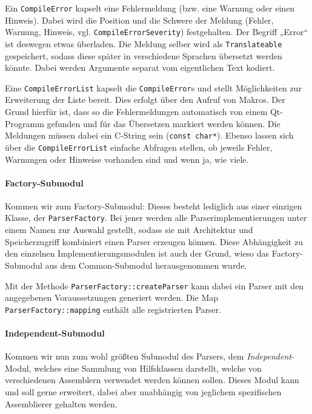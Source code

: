 Ein \texttt{CompileError} kapselt eine Fehlermeldung (bzw. eine Warnung oder
einen Hinweis). Dabei wird die Position und die Schwere der Meldung (Fehler,
Warnung, Hinweis, vgl. \texttt{Compile\-Error\-Severity}) festgehalten. Der
Begriff „Error“ ist deswegen etwas überladen. Die Meldung selber wird als
\texttt{Translateable} gespeichert, sodass diese später in verschiedene Sprachen
übersetzt werden könnte. Dabei werden Argumente separat vom eigentlichen Text
kodiert.

Eine \texttt{CompileErrorList} kapselt die \texttt{CompileError}s und stellt
Möglichkeiten zur Erweiterung der Liste bereit. Dies erfolgt über den Aufruf von
Makros. Der Grund hierfür ist, dass so die Fehlermeldungen automatisch von einem
Qt-Programm gefunden und für das Übersetzen markiert werden können. Die
Meldungen müssen dabei ein C-String sein (\texttt{const char*}). Ebenso lassen
sich über die \texttt{CompileErrorList} einfache Abfragen stellen, ob jeweils
Fehler, Warnungen oder Hinweise vorhanden sind und wenn ja, wie viele.

\paragraph{Factory-Submodul}

Kommen wir zum Factory-Submodul: Dieses besteht lediglich aus einer einzigen
Klasse, der \texttt{ParserFactory}. Bei jener werden alle
Parserimplementierungen unter einem Namen zur Auswahl gestellt, sodass sie mit
Architektur und Speicherzugriff kombiniert einen Parser erzeugen können. Diese
Abhängigkeit zu den einzelnen Implementierungsmodulen ist auch der Grund, wieso
das Factory-Submodul aus dem Common-Submodul herausgenommen wurde.

Mit der Methode \texttt{ParserFactory::createParser} kann dabei ein Parser mit
den angegebenen Voraussetzungen generiert werden. Die Map
\texttt{ParserFactory::mapping} enthält alle registrierten Parser.

\paragraph{Independent-Submodul}

Kommen wir nun zum wohl größten Submodul des Parsers, dem
\emph{Independent}-Modul, welches eine Sammlung von Hilfsklassen darstellt,
welche von verschiedenen Assemblern verwendet werden können sollen. Dieses Modul
kann und soll gerne erweitert, dabei aber unabhängig von jeglichem spezifischen
Assemblierer gehalten werden.

